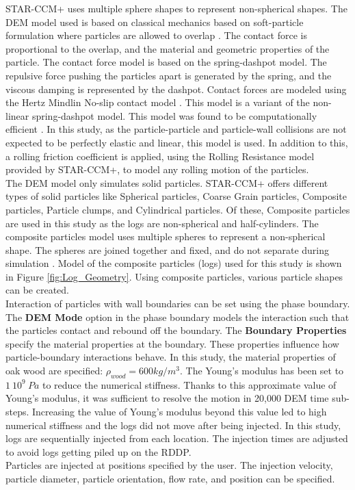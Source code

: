 STAR-CCM+ uses multiple sphere shapes to represent non-spherical shapes. The DEM model used is based on classical mechanics based on soft-particle formulation where particles are allowed to overlap \cite{DEM}. The contact force is proportional to the overlap, and the material and geometric properties of the particle. The contact force model is based on the spring-dashpot model. The repulsive force pushing the particles apart is generated by the spring, and the viscous damping is represented by the dashpot. Contact forces are modeled using the Hertz Mindlin No-slip contact model \cite{DEM}. This model is a variant of the non-linear spring-dashpot model. This model was found to be computationally efficient \cite{DEM}. In this study, as the particle-particle and particle-wall collisions are not expected to be perfectly elastic and linear, this model is used. In addition to this, a rolling friction coefficient is applied, using the Rolling Resistance model provided by STAR-CCM+, to model any rolling motion of the particles.\\
The DEM model only simulates solid particles. STAR-CCM+ offers different types of solid particles like Spherical particles, Coarse Grain particles, Composite particles, Particle clumps, and Cylindrical particles. Of these, Composite particles are used in this study as the logs are non-spherical and half-cylinders. The composite particles model uses multiple spheres to represent a non-spherical shape. The spheres are joined together and fixed, and do not separate during simulation \cite{CompositeP}. Model of the composite particles (logs) used for this study is shown in Figure \ref{fig:Log_Geometry}. Using composite particles, various particle shapes can be created. \\
Interaction of particles with wall boundaries can be set using the phase boundary. The \textbf{DEM Mode} option in the phase boundary models the interaction such that the particles contact and rebound off the boundary. The \textbf{Boundary Properties} specify the material properties at the boundary. These properties influence how particle-boundary interactions behave. In this study, the material properties of oak wood are specified: $\rho_{wood} = 600 kg/m^3$. The Young's modulus has been set to $1~10^9~Pa$ to reduce the numerical stiffness. Thanks to this approximate value of Young's modulus, it was sufficient to resolve the motion in 20,000 DEM time sub-steps. Increasing the value of Young's modulus beyond this value led to high numerical stiffness and the logs did not move after being injected. In this study, logs are sequentially injected from each location. The injection times are adjusted to avoid logs getting piled up on the RDDP.\\
Particles are injected at positions specified by the user. The injection velocity, particle diameter, particle orientation, flow rate, and position can be specified. 
